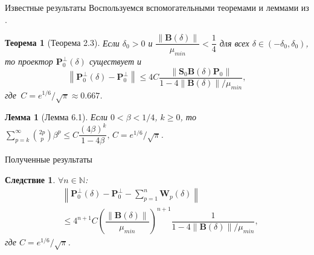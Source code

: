 \documentclass[notheorems, handout]{beamer}
\newtheorem{corollary}{Следствие}
\newtheorem{theorem}{Теорема}
\newtheorem{lemma}{Лемма}
\newcommand{\norm}[1]{\left\|#1\right\|}
\begin{document}
	\begin{frame}{Известные результаты}
		Воспользуемся вспомогательными теоремами и леммами из \cite{Nekrutkin10}.
		\begin{theorem}[Теорема 2.3]
			\label{th:2.3}
			\rm \emph{Если} $\delta_0 > 0$ \emph{и} $\dfrac{\norm{\mathbf{B}(\delta)}}{\mu_{min}} < \dfrac{1}{4}$ \emph{для всех} $\delta \in (-\delta_0, \delta_0)$\emph{, то проектор} $\mathbf{P}^\bot_0(\delta)$ \emph{существует и} \begin{equation}\norm{\mathbf{P}_0^\bot(\delta) - \mathbf{P}_0^\bot} \leqslant 4C\dfrac{\norm{\mathbf{S}_0\mathbf{B}(\delta)\mathbf{P}_0}}{1 - 4\norm{\mathbf{B}(\delta)}/\mu_{min}}\label{eq:6},
			\end{equation}
			\emph{где} $\,C = e^{1/6}/\sqrt{\pi}\approx0.667$.
		\end{theorem}%
		
		\begin{lemma}[Лемма 6.1]
			\label{lem:6.1}
			\rm \emph{Если} $0<\beta<{1}/{4}$, $k \geqslant 0$\emph{, то}
			$\sum^\infty_{p=k}{2p \choose p}\beta^p \leqslant C\dfrac{(4\beta)^k}{1-4\beta},\,C = e^{1/6}/\sqrt{\pi}$.
		\end{lemma}%
	\end{frame}
	\begin{frame}{Полученные результаты}
		\begin{corollary}
			$\forall n\in\mathbb{N}$:
			\begin{align}
				&\norm{\mathbf{P}_0^\bot(\delta) - \mathbf{P}_0^\bot - \sum\limits^n_{p=1}\mathbf{W}_p(\delta)}\nonumber
				\\
				&\leqslant 4^{n+1}C\left(\dfrac{\norm{\mathbf{B}(\delta)}}{\mu_{min}}\right)^{n+1}\dfrac{1}{1-4\norm{\mathbf{B}(\delta)}/\mu_{min}},\label{eq:m_2}
			\end{align}
			где $C = e^{1/6}/\sqrt{\pi}$.
		\end{corollary}
	\end{frame}
\end{document}
